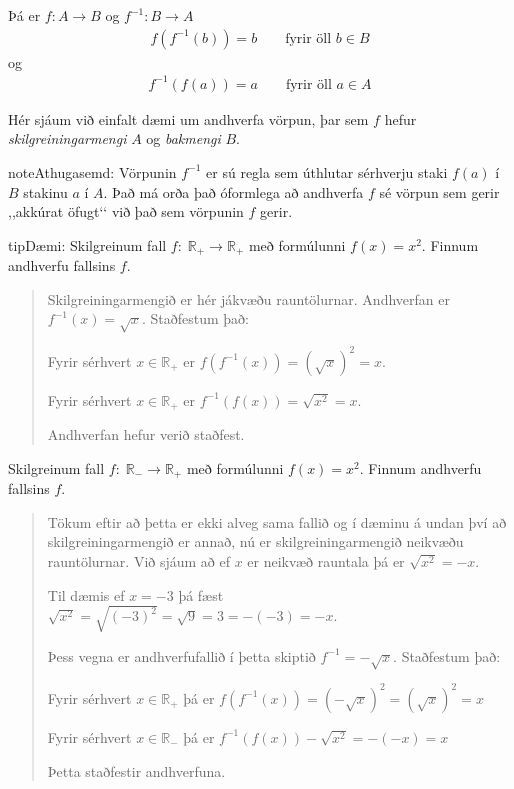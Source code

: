 \documentclass[a4paper,10pt,icelandic]{sphinxmanual}
\begin{document}
Þá er \(f: A \to B\) og \(f^{-1}: B \to A\)
\begin{equation*}
\begin{split}f(f^{-1}(b))=b \qquad \text{fyrir öll } b \in B\end{split}
\end{equation*}
og
\begin{equation*}
\begin{split}f^{-1}(f(a))=a \qquad \text{fyrir öll } a \in A\end{split}
\end{equation*}

Hér sjáum við einfalt dæmi um andhverfa vörpun, þar sem \(f\) hefur \textit{skilgreiningarmengi} \(A\) og \textit{bakmengi} \(B\).

\begin{sphinxadmonition}{note}{Athugasemd:}
Vörpunin \(f^{-1}\) er sú regla sem úthlutar sérhverju staki \(f(a)\) í \(B\) stakinu \(a\) í \(A\). Það má orða það óformlega að andhverfa \(f\) sé vörpun sem gerir ,,akkúrat öfugt‘‘ við það sem vörpunin \(f\) gerir.
\end{sphinxadmonition}

\begin{sphinxadmonition}{tip}{Dæmi:}
 Skilgreinum fall \(f:\; \mathbb{R}_+\to \mathbb{R}_+\) með formúlunni \(f(x)=x^2\). Finnum andhverfu fallsins \(f\).
\begin{quote}

Skilgreiningarmengið er hér jákvæðu rauntölurnar. Andhverfan er \(f^{-1}(x)=\sqrt{x}\). Staðfestum það:

Fyrir sérhvert \(x\in \mathbb{R}_+\) er \(f(f^{-1}(x))=(\sqrt{x})^2=x\).

Fyrir sérhvert \(x\in \mathbb{R}_+\) er \(f^{-1}(f(x))=\sqrt{x^2}=x\).

Andhverfan hefur verið staðfest.
\end{quote}

 Skilgreinum fall \(f:\; \mathbb{R}_-\to \mathbb{R}_+\) með formúlunni \(f(x)=x^2\). Finnum andhverfu fallsins \(f\).
\begin{quote}

Tökum eftir að þetta er ekki alveg sama fallið og í dæminu á undan því að skilgreiningarmengið er annað, nú er skilgreiningarmengið neikvæðu rauntölurnar. Við sjáum að ef \(x\) er neikvæð rauntala þá er \(\sqrt{x^2}=-x\).

Til dæmis ef \(x=-3\) þá fæst \(\sqrt{x^2}=\sqrt{(-3)^2}=\sqrt{9}=3=-(-3)=-x\).

Þess vegna er andhverfufallið í þetta skiptið \(f^{-1}=-\sqrt{x}\).
Staðfestum það:

Fyrir sérhvert \(x\in\mathbb{R}_+\) þá er \(f(f^{-1}(x))=(-\sqrt{x})^2=(\sqrt{x})^2=x\)

Fyrir sérhvert \(x\in\mathbb{R}_-\) þá er \(f^{-1}(f(x))-\sqrt{x^2}=-(-x)=x\)

Þetta staðfestir andhverfuna.
\end{quote}
\end{sphinxadmonition}
\end{document}
